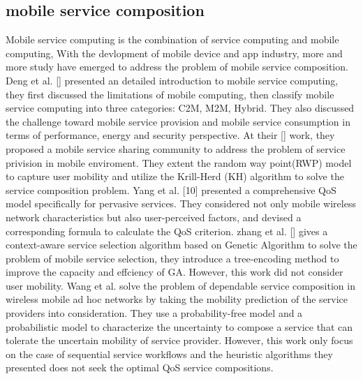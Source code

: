 \documentclass[10pt,journal,compsoc]{IEEEtran}
\begin{document}
\subsection{mobile service composition}
Mobile service computing is the combination of service computing and mobile computing, With the devlopment of mobile device and app industry, more and more study have emerged to address the problem of mobile service composition. 
Deng et al. [] presented an detailed introduction to mobile service computing, they first discussed the limitations of mobile computing, then classify mobile service computing into three categories: C2M, M2M, Hybrid. They also discussed the challenge toward mobile service provision and mobile service consumption in terms of performance, energy and security perspective. At their [] work, they proposed a mobile service sharing community to address the problem of service privision in mobile enviroment. They extent the random way point(RWP) model to capture user mobility and utilize the Krill-Herd (KH) algorithm to solve the service composition problem. Yang et al. [10] presented a comprehensive QoS model specifically for pervasive services. They considered not only mobile wireless network characteristics but also user-perceived factors, and devised a corresponding formula to calculate the QoS criterion. 
zhang et al. [] gives a context-aware service selection algorithm based on Genetic Algorithm to solve the problem of mobile service selection, they introduce a tree-encoding method to improve the capacity and effciency of GA. However, this work did not consider user mobility.
Wang et al. \cite{wang2011exploiting} solve the problem of dependable service composition in wireless mobile ad hoc networks by taking the mobility prediction of the service providers into consideration.
They use a probability-free model and a probabilistic model to characterize the uncertainty to compose a service that can tolerate the uncertain mobility of service provider. However, this work only focus on the case of sequential service workflows and the heuristic algorithms they presented does not seek the optimal QoS service compositions.
\end{document}
